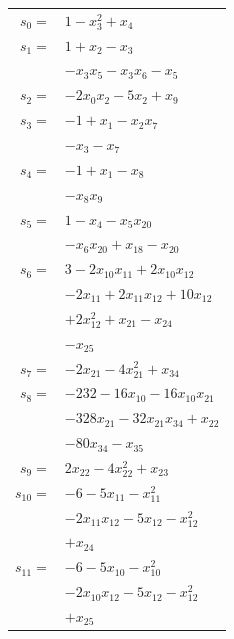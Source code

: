 \begingroup
\small
\setlength{\tabcolsep}{2pt}
\setlength{\LTleft}{0pt}
\begin{longtable}{@{}r@{\;}l@{}}
\(s_{0}=\) & \(\displaystyle 1 -x_{3}^{2} +x_{4}\) \\[3pt]
\(s_{1}=\) & \(\displaystyle 1 +x_{2} -x_{3}\) \\
 & \(\displaystyle -x_{3}x_{5} -x_{3}x_{6} -x_{5}\) \\[3pt]
\(s_{2}=\) & \(\displaystyle -2x_{0}x_{2} -5x_{2} +x_{9}\) \\[3pt]
\(s_{3}=\) & \(\displaystyle -1 +x_{1} -x_{2}x_{7}\) \\
 & \(\displaystyle -x_{3} -x_{7}\) \\[3pt]
\(s_{4}=\) & \(\displaystyle -1 +x_{1} -x_{8}\) \\
 & \(\displaystyle -x_{8}x_{9}\) \\[3pt]
\(s_{5}=\) & \(\displaystyle 1 -x_{4} -x_{5}x_{20}\) \\
 & \(\displaystyle -x_{6}x_{20} +x_{18} -x_{20}\) \\[3pt]
\(s_{6}=\) & \(\displaystyle 3 -2x_{10}x_{11} +2x_{10}x_{12}\) \\
 & \(\displaystyle -2x_{11} +2x_{11}x_{12} +10x_{12}\) \\
 & \(\displaystyle +2x_{12}^{2} +x_{21} -x_{24}\) \\
 & \(\displaystyle -x_{25}\) \\[3pt]
\(s_{7}=\) & \(\displaystyle -2x_{21} -4x_{21}^{2} +x_{34}\) \\[3pt]
\(s_{8}=\) & \(\displaystyle -232 -16x_{10} -16x_{10}x_{21}\) \\
 & \(\displaystyle -328x_{21} -32x_{21}x_{34} +x_{22}\) \\
 & \(\displaystyle -80x_{34} -x_{35}\) \\[3pt]
\(s_{9}=\) & \(\displaystyle 2x_{22} -4x_{22}^{2} +x_{23}\) \\[3pt]
\(s_{10}=\) & \(\displaystyle -6 -5x_{11} -x_{11}^{2}\) \\
 & \(\displaystyle -2x_{11}x_{12} -5x_{12} -x_{12}^{2}\) \\
 & \(\displaystyle +x_{24}\) \\[3pt]
\(s_{11}=\) & \(\displaystyle -6 -5x_{10} -x_{10}^{2}\) \\
 & \(\displaystyle -2x_{10}x_{12} -5x_{12} -x_{12}^{2}\) \\
 & \(\displaystyle +x_{25}\) \\[3pt]

\end{longtable}
